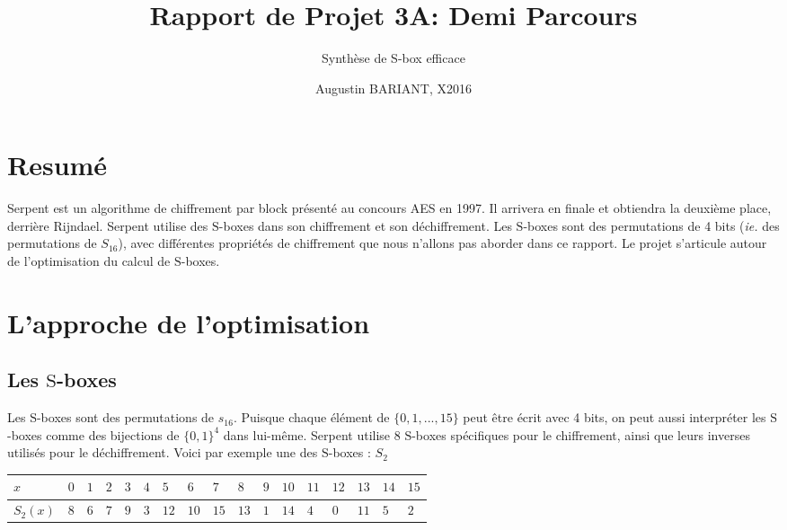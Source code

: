 \documentclass{article}
\title{Rapport de Projet 3A: Demi Parcours}
\subtitle{Synthèse de S-box efficace}
\author{Augustin BARIANT, X2016}
\begin{document}
\maketitle
\tableofcontents
\section{Resumé}



\bigbreak

Serpent est un algorithme de chiffrement par block présenté au concours AES en 1997. Il arrivera en finale et obtiendra la deuxième place, derrière Rijndael. Serpent utilise des $\mathrm{S}$-boxes dans son chiffrement et son déchiffrement. Les $\mathrm{S}$-boxes sont des permutations de 4 bits (\textit{ie.} des permutations de $S_{16}$), avec différentes propriétés de chiffrement que nous n'allons pas aborder dans ce rapport. Le projet s'articule autour de l'optimisation du calcul de $\mathrm{S}$-boxes. 


\section{L'approche de l'optimisation}

\subsection{Les $\mathrm{S}$-boxes}

Les $\mathrm{S}$-boxes sont des permutations de $s_{16}$. Puisque chaque élément de $\{0,1,...,15\}$ peut être écrit avec 4 bits, on peut aussi interpréter les $\mathrm{S}$-boxes comme des bijections de $\{0,1\}^{4}$ dans lui-même. Serpent utilise 8 $\mathrm{S}$-boxes spécifiques pour le chiffrement, ainsi que leurs inverses utilisés pour le déchiffrement. Voici par exemple une des $\mathrm{S}$-boxes : $S_{2}$
\medbreak
\begin{center}
\begin{tabular}{|l|l|l|l|l|l|l|l|l|l|l|l|l|l|l|l|l|}
\hline
\multicolumn{1}{|l|}{$x$}&	\multicolumn{1}{|l|}{ $0$}&	\multicolumn{1}{|l|}{ $1$}&	\multicolumn{1}{|l|}{ $2$}&	\multicolumn{1}{|l|}{ $3$}&	\multicolumn{1}{|l|}{ $4$}&	\multicolumn{1}{|l|}{ $5$}&	\multicolumn{1}{|l|}{ $6$}&	\multicolumn{1}{|l|}{ $7$}&	\multicolumn{1}{|l|}{ $8$}&	\multicolumn{1}{|l|}{ $9$}&	\multicolumn{1}{|l|}{ $10$}&	\multicolumn{1}{|l|}{ $11$}&	\multicolumn{1}{|l|}{ $12$}&	\multicolumn{1}{|l|}{ $13$}&	\multicolumn{1}{|l|}{ $14$}&	\multicolumn{1}{|l|}{ $15$}	\\
\hline
\multicolumn{1}{|l|}{ $S_{2}(x)$}&	\multicolumn{1}{|l|}{ $8$}&	\multicolumn{1}{|l|}{ $6$}&	\multicolumn{1}{|l|}{ $7$}&	\multicolumn{1}{|l|}{ $9$}&	\multicolumn{1}{|l|}{ $3$}&	\multicolumn{1}{|l|}{ $12$}&	\multicolumn{1}{|l|}{ $10$}&	\multicolumn{1}{|l|}{ $15$}&	\multicolumn{1}{|l|}{ $13$}&	\multicolumn{1}{|l|}{ $1$}&	\multicolumn{1}{|l|}{ $14$}&	\multicolumn{1}{|l|}{ $4$}&	\multicolumn{1}{|l|}{ $0$}&	\multicolumn{1}{|l|}{ $11$}&	\multicolumn{1}{|l|}{ $5$}&	\multicolumn{1}{|l|}{ $2$}	\\
\hline

\end{tabular}
\end{center}
\medbreak
\end{document}
